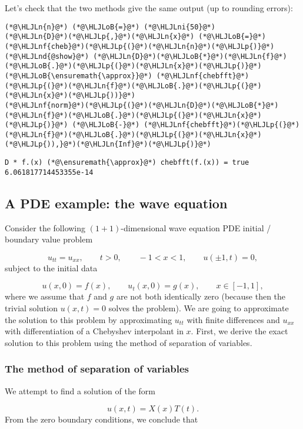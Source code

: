 \documentclass[12pt,a4paper]{article}
\newcommand{\HLJLn}[1]{#1}
\newcommand{\HLJLnd}[1]{\textcolor[RGB]{214,102,97}{#1}}
\newcommand{\HLJLnf}[1]{\textcolor[RGB]{66,102,213}{#1}}
\newcommand{\HLJLni}[1]{\textcolor[RGB]{59,151,46}{#1}}
\newcommand{\HLJLoB}[1]{\textcolor[RGB]{102,102,102}{\textbf{#1}}}
\newcommand{\HLJLp}[1]{#1}
\begin{document}
Let's check that the two methods give the same output (up to rounding errors):


\begin{lstlisting}
(*@\HLJLn{n}@*) (*@\HLJLoB{=}@*) (*@\HLJLni{50}@*)
(*@\HLJLn{D}@*)(*@\HLJLp{,}@*)(*@\HLJLn{x}@*) (*@\HLJLoB{=}@*) (*@\HLJLnf{cheb}@*)(*@\HLJLp{(}@*)(*@\HLJLn{n}@*)(*@\HLJLp{)}@*)
(*@\HLJLnd{@show}@*) (*@\HLJLn{D}@*)(*@\HLJLoB{*}@*)(*@\HLJLn{f}@*)(*@\HLJLoB{.}@*)(*@\HLJLp{(}@*)(*@\HLJLn{x}@*)(*@\HLJLp{)}@*) (*@\HLJLoB{\ensuremath{\approx}}@*) (*@\HLJLnf{chebfft}@*)(*@\HLJLp{(}@*)(*@\HLJLn{f}@*)(*@\HLJLoB{.}@*)(*@\HLJLp{(}@*)(*@\HLJLn{x}@*)(*@\HLJLp{))}@*)
(*@\HLJLnf{norm}@*)(*@\HLJLp{(}@*)(*@\HLJLn{D}@*)(*@\HLJLoB{*}@*)(*@\HLJLn{f}@*)(*@\HLJLoB{.}@*)(*@\HLJLp{(}@*)(*@\HLJLn{x}@*)(*@\HLJLp{)}@*) (*@\HLJLoB{-}@*) (*@\HLJLnf{chebfft}@*)(*@\HLJLp{(}@*)(*@\HLJLn{f}@*)(*@\HLJLoB{.}@*)(*@\HLJLp{(}@*)(*@\HLJLn{x}@*)(*@\HLJLp{)),}@*)(*@\HLJLn{Inf}@*)(*@\HLJLp{)}@*)
\end{lstlisting}

\begin{lstlisting}
D * f.(x) (*@\ensuremath{\approx}@*) chebfft(f.(x)) = true
6.061817714453355e-14
\end{lstlisting}


\subsection{A PDE example: the wave equation}
Consider the following $(1+1)$-dimensional wave equation PDE initial / boundary value problem 

\[
u_{tt} = u_{xx}, \qquad t > 0, \qquad -1 < x < 1, \qquad u(\pm 1, t) = 0,
\]
subject to the initial data

\[
u(x,0) = f(x), \qquad u_t(x,0) = g(x), \qquad x \in [-1, 1],
\]
where we assume that $f$ and $g$ are not both identically zero (because then the trivial solution $u(x,t) = 0$ solves the problem).  We are going to approximate the solution to this problem by approximating $u_{tt}$ with finite differences and $u_{xx}$ with differentiation of a Chebyshev interpolant in $x$. First, we derive the exact solution to this problem using the method of separation of variables. 

\subsubsection{The method of separation of variables}
We attempt to find a solution of the form

\[
u(x,t) = X(x)T(t).
\]
From the zero boundary conditions, we conclude that
\end{document}
